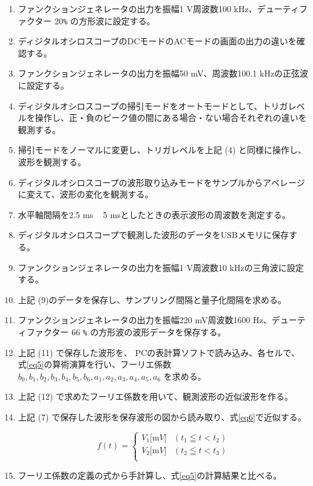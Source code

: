 \begin{enumerate}
  \setlength{\parskip}{0cm} %
  \setlength{\itemsep}{0cm} %
  \item ファンクションジェネレータの出力を振幅1 V周波数100 kHz、デューティファクター 20\verb|%| の方形波に設定する。
  \item ディジタルオシロスコープのDCモードのACモードの画面の出力の違いを確認する。
  \item ファンクションジェネレータの出力を振幅50 mV、周波数100.1 kHzの正弦波に設定する。
  \item ディジタルオシロスコープの掃引モードをオートモードとして、トリガレベルを操作し、正・負のピーク値の間にある場合・ない場合それぞれの違いを観測する。
  \item 掃引モードをノーマルに変更し、トリガレベルを上記 (4) と同様に操作し、波形を観測する。
  \item ディジタルオシロスコープの波形取り込みモードをサンプルからアベレージに変えて、波形の変化を観測する。
  \item 水平軸間隔を2.5 ms ~ 5 msとしたときの表示波形の周波数を測定する。
  \item ディジタルオシロスコープで観測した波形のデータをUSBメモリに保存する。
  \item ファンクションジェネレータの出力を振幅1 V周波数10 kHzの三角波に設定する。
  \item 上記 (9)のデータを保存し、サンプリング間隔と量子化間隔を求める。
  \item ファンクションジェネレータの出力を振幅220 mV周波数1600 Hz、デューティファクター 66 \verb|%| の方形波の波形データを保存する。
  \item 上記 (11) で保存した波形を、 PCの表計算ソフトで読み込み、各セルで、
  式\eqref{eq5}の算術演算を行い、フーリエ係数 $b_0, b_1, b_2, b_3, b_4, b_5, b_6, a_1, a_2, a_3, a_4, a_5, a_6$ を求める。
  \item 上記 (12) で求めたフーリエ係数を用いて、観測波形の近似波形を作る。
  \item 上記 (7) で保存した波形を保存波形の図から読み取り、式\eqref{eq6}で近似する。\\
  \begin{screen}
  \begin{equation}
    f(t) = \left\{
    \begin{array}{ll}
    V_1 \si{[\milli V]} & (t_1 \leqq t < t_2)\\
    V_2 \si{[\milli V]} & (t_2 \leqq t < t_3)\\
    \end{array}
  \right.
  \label{eq6}
  \end{equation}
\end{screen}
  \item フーリエ係数の定義の式から手計算し、式\ref{eq5}の計算結果と比べる。
\end{enumerate}


